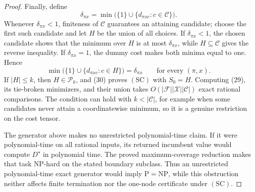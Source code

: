 \documentclass{article}
\begin{document}
\begin{proof}
Finally, define
\[
\delta_{\pi x}=
\min\bigl(\{1\}\cup\{d_{\pi xc}:c\in\mathcal C\}\bigr).              \tag{29}
\]
Whenever \(\delta_{\pi x}<1\), finiteness of \(\mathcal C\) guarantees an
attaining candidate; choose the first such candidate and let \(H\) be the
union of all choices.  If \(\delta_{\pi x}<1\), the chosen candidate shows
that the minimum over \(H\) is at most \(\delta_{\pi x}\), while
\(H\subseteq\mathcal C\) gives the reverse inequality.  If
\(\delta_{\pi x}=1\), the dummy cost makes both minima equal to one.  Hence
\[
\min\bigl(\{1\}\cup\{d_{\pi xc}:c\in H\}\bigr)=\delta_{\pi x}
\qquad\text{for every }(\pi,x).                                       \tag{30}
\]
If \(|H|\leq k\), then \(H\in\mathcal P_k\), and (30) proves
\(\mathrm{(SC)}\) with \(S_0=H\).  Computing (29), its tie-broken
minimizers, and their union takes
\(O(|\mathcal F||\mathcal X||\mathcal C|)\) exact rational comparisons.
The condition can hold with \(k<|\mathcal C|\), for example when some
candidates never attain a coordinatewise minimum, so it is a genuine
restriction on the cost tensor.

The generator above makes no unrestricted polynomial-time claim.  If it
were polynomial-time on all rational inputs, its returned incumbent value
would compute \(D^\star\) in polynomial time.  The proved maximum-coverage
reduction makes that task NP-hard on the stated boundary subclass.  Thus an
unrestricted polynomial-time exact generator would imply
\(\mathrm P=\mathrm{NP}\), while this obstruction neither affects finite
termination nor the one-node certificate under \(\mathrm{(SC)}\).
\end{proof}
\end{document}

